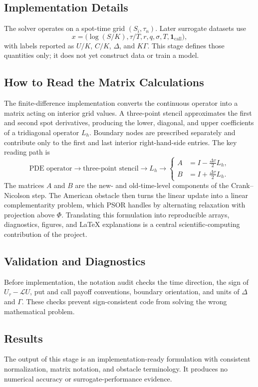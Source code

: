 \documentclass[11pt]{article}
\begin{document}
\subsection{Implementation Details}
The solver operates on a spot-time grid \((S_i,\tau_n)\). Later surrogate
datasets use
\[
  x=\bigl(\log(S/K),\tau/T,r,q,\sigma,T,\mathbf{1}_{\mathrm{call}}\bigr),
\]
with labels reported as \(U/K\), \(C/K\), \(\Delta\), and \(K\Gamma\). This
stage defines those quantities only; it does not yet construct data or train a
model.

\subsection{How to Read the Matrix Calculations}
The finite-difference implementation converts the continuous operator into a
matrix acting on interior grid values. A three-point stencil approximates the
first and second spot derivatives, producing the lower, diagonal, and upper
coefficients of a tridiagonal operator \(L_h\). Boundary nodes are prescribed
separately and contribute only to the first and last interior right-hand-side
entries. The key reading path is
\[
  \text{PDE operator}
  \longrightarrow \text{three-point stencil}
  \longrightarrow L_h
  \longrightarrow
  \left\{
  \begin{aligned}
    A&=I-\frac{\Delta\tau}{2}L_h,\\
    B&=I+\frac{\Delta\tau}{2}L_h.
  \end{aligned}
  \right.
\]
The matrices \(A\) and \(B\) are the new- and old-time-level components of the
Crank--Nicolson step. The American obstacle then turns the linear update into a
linear complementarity problem, which PSOR handles by alternating relaxation
with projection above \(\Phi\). Translating this formulation into reproducible
arrays, diagnostics, figures, and LaTeX explanations is a central
scientific-computing contribution of the project.

\subsection{Validation and Diagnostics}
Before implementation, the notation audit checks the time direction, the sign
of \(U_\tau-\mathcal{L}U\), put and call payoff conventions, boundary
orientation, and units of \(\Delta\) and \(\Gamma\). These checks prevent
sign-consistent code from solving the wrong mathematical problem.

\subsection{Results}
The output of this stage is an implementation-ready formulation with consistent
normalization, matrix notation, and obstacle terminology. It produces no
numerical accuracy or surrogate-performance evidence.
\end{document}
